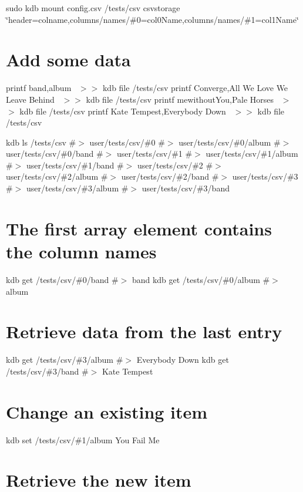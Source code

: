 sudo kdb mount config.\+csv /tests/csv csvstorage \char`\"{}header=colname,columns/names/\#0=col0\+Name,columns/names/\#1=col1\+Name\char`\"{}

\section*{Add some data}

printf \textquotesingle{}band,album~\newline
\textquotesingle{} $>$$>$ {\ttfamily kdb file /tests/csv} printf \textquotesingle{}Converge,All We Love We Leave Behind~\newline
\textquotesingle{} $>$$>$ {\ttfamily kdb file /tests/csv} printf \textquotesingle{}mewithout\+You,Pale Horses~\newline
\textquotesingle{} $>$$>$ {\ttfamily kdb file /tests/csv} printf \textquotesingle{}Kate Tempest,Everybody Down~\newline
\textquotesingle{} $>$$>$ {\ttfamily kdb file /tests/csv}

kdb ls /tests/csv \#$>$ user/tests/csv/\#0 \#$>$ user/tests/csv/\#0/album \#$>$ user/tests/csv/\#0/band \#$>$ user/tests/csv/\#1 \#$>$ user/tests/csv/\#1/album \#$>$ user/tests/csv/\#1/band \#$>$ user/tests/csv/\#2 \#$>$ user/tests/csv/\#2/album \#$>$ user/tests/csv/\#2/band \#$>$ user/tests/csv/\#3 \#$>$ user/tests/csv/\#3/album \#$>$ user/tests/csv/\#3/band

\section*{The first array element contains the column names}

kdb get /tests/csv/\#0/band \#$>$ band kdb get /tests/csv/\#0/album \#$>$ album

\section*{Retrieve data from the last entry}

kdb get /tests/csv/\#3/album \#$>$ Everybody Down kdb get /tests/csv/\#3/band \#$>$ Kate Tempest

\section*{Change an existing item}

kdb set /tests/csv/\#1/album \textquotesingle{}You Fail Me\textquotesingle{} \section*{Retrieve the new item}

